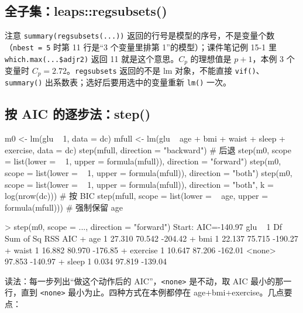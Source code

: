 \subsection{全子集：leaps::regsubsets()}
注意 \Verb|summary(regsubsets(...))| 返回的行号是模型的序号，不是变量个数（\Verb|nbest = 5| 时第 11 行是“3 个变量里排第 1”的模型）；课件笔记例 15-1 里 \Verb|which.max(...$adjr2)| 返回 11 就是这个意思。$C_p$ 的理想值是 $p+1$，本例 3 个变量时 $C_p=2.72$。\Verb|regsubsets| 返回的不是 lm 对象，不能直接 \Verb|vif()|、\Verb|summary()| 出系数表；选好后要用选中的变量重新 \Verb|lm()| 一次。

\subsection{按 AIC 的逐步法：step()}
\begin{RCode}
m0    <- lm(glu ~ 1, data = dc)
mfull <- lm(glu ~ age + bmi + waist + sleep + exercise, data = dc)
step(mfull, direction = "backward")                                  # 后退
step(m0, scope = list(lower = ~ 1, upper = formula(mfull)), direction = "forward")
step(m0, scope = list(lower = ~ 1, upper = formula(mfull)), direction = "both")
step(m0, scope = list(lower = ~ 1, upper = formula(mfull)), direction = "both",
     k = log(nrow(dc)))                                              # 按 BIC
step(mfull, scope = list(lower = ~ age, upper = formula(mfull)))     # 强制保留 age
\end{RCode}
\begin{ROut}
> step(m0, scope = ..., direction = "forward")
Start:  AIC=-140.97
glu ~ 1
           Df Sum of Sq    RSS     AIC
+ age       1    27.310 70.542 -204.42
+ bmi       1    22.137 75.715 -190.27
+ waist     1    16.882 80.970 -176.85
+ exercise  1    10.647 87.206 -162.01
<none>                  97.853 -140.97
+ sleep     1     0.034 97.819 -139.04
\end{ROut}
读法：每一步列出“做这个动作后的 AIC”，\Verb|<none>| 是不动，取 AIC 最小的那一行，直到 \Verb|<none>| 最小为止。四种方式在本例都停在 age+bmi+exercise。几点要点：

